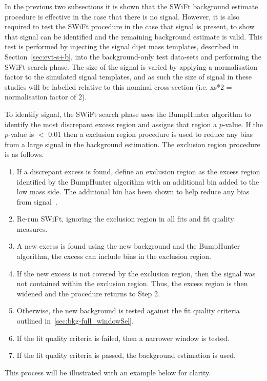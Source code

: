 In the previous two subsections it is shown that the SWiFt background estimate procedure is effective in the case that there is no signal.
However, it is also required to test the SWiFt procedure in the case that signal is present, to show that signal can be identified and the remaining background estimate is valid.
This test is performed by injecting the signal dijet mass templates, described in Section~\ref{sec:evt-s+b}, into the background-only test data-sets and performing the SWiFt search phase.
The size of the signal is varied by applying a normalisation factor to the simulated signal templates,
and as such the size of signal in these studies will be labelled relative to this nominal cross-section (i.e. xs*2 = normalisation factor of 2).

To identify signal, the SWiFt search phase uses the {\sc BumpHunter} algorithm to identify the most discrepant excess region and assigns that region a \mbox{$p$-value}.
If the \mbox{$p$-value} is $<$ 0.01 then a exclusion region procedure is used to reduce any bias from a large signal in the background estimation.
The exclusion region procedure is as follows.
\begin{enumerate}[leftmargin=*]
\item If a discrepant excess is found, define an exclusion region as the excess
  region identified by the {\sc BumpHunter} algorithm with an additional \mjj{} bin added to the low mass side.
  The additional bin has been shown to help reduce any bias from signal~\cite{dijet-mori16_paper}.
\item Re-run SWiFt, ignoring the exclusion region in all fits and fit quality measures.
\item A new excess is found using the new background and the {\sc BumpHunter} algorithm,
  the excess can include bins in the exclusion region.
\item If the new excess is not covered by the exclusion region, then the signal was not contained within the exclusion region.
  Thus, the excess region is then widened and the procedure returns to Step 2.
\item Otherwise, the new background is tested against the fit quality criteria outlined in~\ref{sec:bkg-full_windowSel}.
\item If the fit quality criteria is failed, then a narrower window is tested.
\item If the fit quality criteria is passed, the background estimation is used.
\end{enumerate}
This process will be illustrated with an example below for clarity.
 
